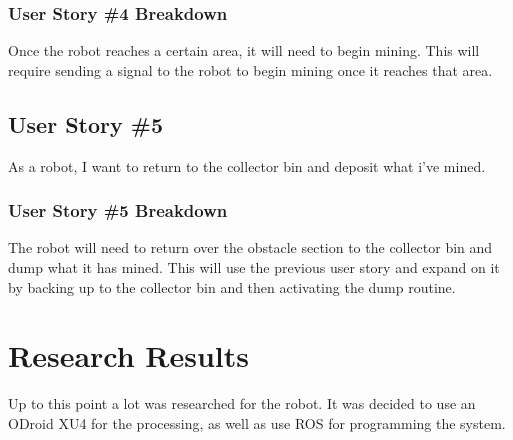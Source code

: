 \subsubsection{User Story \#4 Breakdown}
Once the robot reaches a certain area, it will need to begin mining. This will require sending a signal to the robot to begin mining once it reaches that area.


\subsection{User Story \#5} 
As a robot, I want to return to the collector bin and deposit what i've mined.
\subsubsection{User Story \#5 Breakdown}
The robot will need to return over the obstacle section to the collector bin and dump what it has mined. This will use the previous user story and expand on it by backing up to the collector bin and then activating the dump routine.



\section{Research Results}
Up to this point a lot was researched for the robot. It was decided to use an ODroid XU4 for the processing, as well as use ROS for programming the system.

